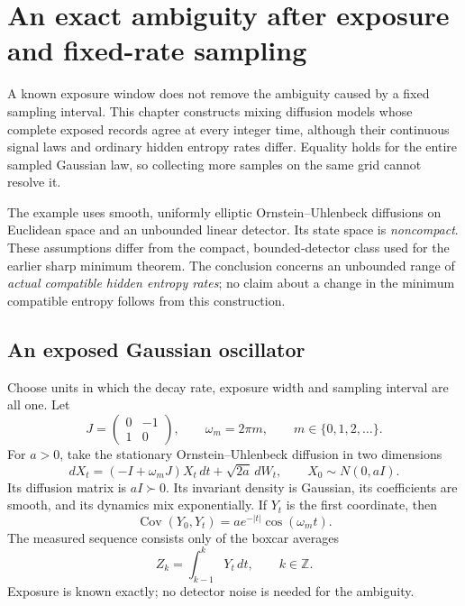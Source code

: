 \chapter[Exposure and fixed-rate sampling]{An exact ambiguity after exposure and fixed-rate sampling}
\label{ch:dg-fixed-grid}

A known exposure window does not remove the ambiguity caused by a fixed
sampling interval. This chapter constructs mixing diffusion models whose
complete exposed records agree at every integer time, although their
continuous signal laws and ordinary hidden entropy rates differ. Equality
holds for the entire sampled Gaussian law, so collecting more samples on
the same grid cannot resolve it.

The example uses smooth, uniformly elliptic Ornstein--Uhlenbeck diffusions
on Euclidean space and an unbounded linear detector. Its state space is
\emph{noncompact}. These assumptions differ from the compact, bounded-detector
class used for the earlier sharp minimum theorem. The conclusion concerns
an unbounded range of \emph{actual compatible hidden entropy rates}; no
claim about a change in the minimum compatible entropy follows from this
construction.

\section{An exposed Gaussian oscillator}

Choose units in which the decay rate, exposure width and sampling interval
are all one. Let
\[
 J=\begin{pmatrix}0&-1\\1&0\end{pmatrix},\qquad
 \omega_m=2\pi m,\qquad m\in\{0,1,2,\ldots\}.
\]
For $a>0$, take the stationary Ornstein--Uhlenbeck diffusion in two dimensions
\begin{equation}
 dX_t=(-I+\omega_mJ)X_t\,dt+\sqrt{2a}\,dW_t,
 \qquad X_0\sim N(0,aI).
 \label{eq:dg-ou-model}
\end{equation}
Its diffusion matrix is $aI\succ0$. Its invariant density is Gaussian,
its coefficients are smooth, and its dynamics mix exponentially. If
$Y_t$ is the first coordinate, then
\begin{equation}
 \operatorname{Cov}(Y_0,Y_t)
 =a e^{-|t|}\cos(\omega_mt).
 \label{eq:dg-ou-covariance}
\end{equation}
The measured sequence consists only of the boxcar averages
\begin{equation}
 Z_k=\int_{k-1}^{k}Y_t\,dt,\qquad k\in\mathbb Z.
 \label{eq:dg-ou-readout}
\end{equation}
Exposure is known exactly; no detector noise is needed for the ambiguity.

